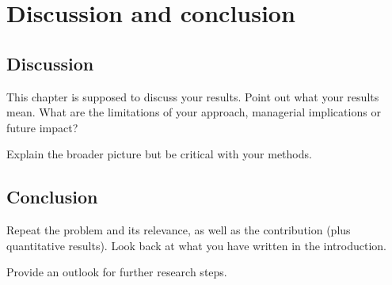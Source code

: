 \chapter{Discussion and conclusion}
\label{ch:discussion-conclusion}

\section{Discussion}
\label{sec:discussion}

This chapter is supposed to discuss your results. Point out what your results mean.
What are the limitations of your approach, managerial implications or future impact?

Explain the broader picture but be critical with your methods.

\section{Conclusion}
\label{sec:conclusion}

Repeat the problem and its relevance, as well as the contribution (plus quantitative results). 
Look back at what you have written in the introduction.

Provide an outlook for further research steps.